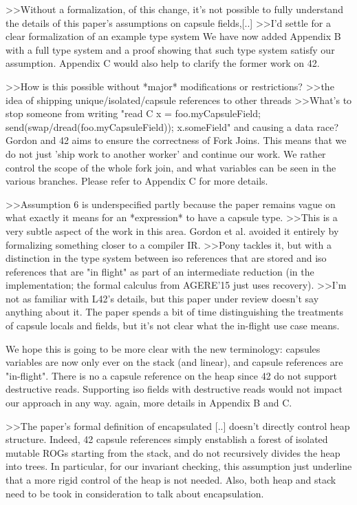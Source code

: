 >>Without a formalization, of this change, it's not possible to fully understand the details of this paper's assumptions on capsule fields,[..]
>>I'd settle for a clear formalization of an example type system
We have now added Appendix B with a full type system and a proof showing that such type system satisfy our assumption.
Appendix C would also help to clarify the former work on 42.


>>How is this possible without *major* modifications or restrictions?
>>the idea of shipping unique/isolated/capsule references to other threads
>>What's to stop someone from writing "read C x = foo.myCapsuleField; send(swap/dread(foo.myCapsuleField)); x.someField" and causing a data race?
Gordon and 42 aims to ensure the correctness of Fork Joins. This means that we do not just 'ship work to another worker' and continue our work.
We rather control the scope of the whole fork join, and what variables can be seen in the various branches. Please refer to Appendix C for more details.


>>Assumption 6 is underspecified partly because the paper remains vague on what exactly it means for an *expression* to have a capsule type.
>>This is a very subtle aspect of the work in this area. Gordon et al. avoided it entirely by formalizing something closer to a compiler IR.
>>Pony tackles it, but with a distinction in the type system between iso references that are stored and iso references that are "in flight" as part of an intermediate reduction (in the implementation; the formal calculus from AGERE'15 just uses recovery).
>>I'm not as familiar with L42's details, but this paper under review doesn't say anything about it. The paper spends a bit of time distinguishing the treatments of capsule locals and fields, but it's not clear what the in-flight use case means.

We hope this is going to be more clear with the new terminology: capsules variables are now only ever on the stack (and linear), and capsule references are "in-flight".
There is no a capsule reference on the heap since 42 do not support destructive reads. Supporting iso fields with destructive reads would not impact our approach in any way.
again, more details in Appendix B and C.

>>The paper's formal definition of encapsulated [..]  doesn't directly control heap structure.
Indeed, 42 capsule references simply enstablish a forest of isolated mutable ROGs starting from the stack, and do not recursively divides the heap into trees.
In particular, for our invariant checking, this assumption just underline that a more rigid control of the heap is not needed. 
Also, both heap and stack need to be took in consideration to talk about encapsulation.


